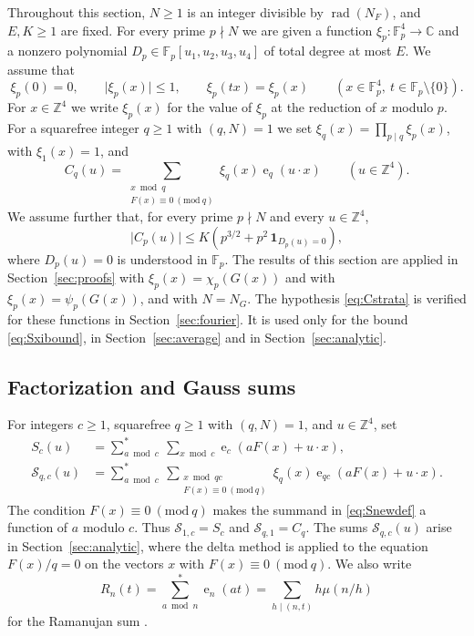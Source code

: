 \documentclass[11pt]{amsart}
\numberwithin{equation}{section}
\numberwithin{figure}{section}
\theoremstyle{definition}
\newcommand{\Z}{\mathbb{Z}}
\newcommand{\C}{\mathbb{C}}
\newcommand{\F}{\mathcal{F}}
\newcommand{\e}{\operatorname{e}}
\newcommand{\imod}[1]{\ (\mathrm{mod}\ #1)}
\newcommand{\abs}[1]{\lvert #1\rvert}
\newcommand{\Fp}{\mathbb F_p}
\newcommand{\rad}{\operatorname{rad}}
\begin{document}
Throughout this section, $N\ge1$ is an integer divisible by
$\rad(N_F)$, and $E,K\ge1$ are fixed. For every prime $p\nmid N$ we
are given a function $\xi_p:\Fp^4\to\C$ and a nonzero polynomial
$D_p\in\Fp[u_1,u_2,u_3,u_4]$ of total degree at most $E$. We assume
that
\begin{equation}\label{eq:weightproperties}
 \xi_p(0)=0,\qquad\abs{\xi_p(x)}\le1,\qquad\xi_p(tx)=\xi_p(x)
 \qquad(x\in\Fp^4,\ t\in\Fp\setminus\{0\}).
\end{equation}
For $x\in\Z^4$ we write $\xi_p(x)$ for the value of $\xi_p$ at the
reduction of $x$ modulo $p$. For a squarefree integer $q\ge1$ with
$(q,N)=1$ we set $\xi_q(x)=\prod_{p\mid q}\xi_p(x)$, with
$\xi_1(x)=1$, and
\begin{equation}\label{eq:Cdef}
 C_q(u)=\sum_{\substack{x\bmod q\\F(x)\equiv0\imod q}}\xi_q(x)\e_q(u\cdot x)
 \qquad(u\in\Z^4).
\end{equation}
We assume further that, for every prime $p\nmid N$ and every
$u\in\Z^4$,
\begin{equation}\label{eq:Cstrata}
 \abs{C_p(u)}\le K(p^{3/2}+p^2\,\mathbf 1_{D_p(u)=0}),
\end{equation}
where $D_p(u)=0$ is understood in $\Fp$. The results of this section
are applied in Section~\ref{sec:proofs} with $\xi_p(x)=\chi_p(G(x))$
and with $\xi_p(x)=\psi_p(G(x))$, and with $N=N_G$. The hypothesis
\eqref{eq:Cstrata} is verified for these functions in
Section~\ref{sec:fourier}. It is used only for the bound
\eqref{eq:Sxibound}, in Section~\ref{sec:average} and in
Section~\ref{sec:analytic}.

\subsection{Factorization and Gauss sums}\label{sec:gauss}

For integers $c\ge1$, squarefree $q\ge1$ with $(q,N)=1$, and
$u\in\Z^4$, set
\begin{align}
 S_c(u)&=\sum_{a\bmod c}^{*}\ \sum_{x\bmod c}\e_c(aF(x)+u\cdot x),\label{eq:Sdef}\\
 \mathcal S_{q,c}(u)&=\sum_{a\bmod c}^{*}\
 \sum_{\substack{x\bmod qc\\F(x)\equiv0\imod q}}
 \xi_q(x)\e_{qc}(aF(x)+u\cdot x).\label{eq:Snewdef}
\end{align}
The condition $F(x)\equiv0\imod q$ makes the summand in
\eqref{eq:Snewdef} a function of $a$ modulo $c$. Thus
$\mathcal S_{1,c}=S_c$ and $\mathcal S_{q,1}=C_q$. The sums
$\mathcal S_{q,c}(u)$ arise in Section~\ref{sec:analytic}, where the
delta method is applied to the equation $F(x)/q=0$ on the vectors
$x$ with $F(x)\equiv0\imod q$. We also write
\begin{equation}\label{eq:ramanujan}
 R_n(t)=\sum_{a\bmod n}^{*}\e_n(at)=\sum_{h\mid(n,t)}h\mu(n/h)
\end{equation}
for the Ramanujan sum \cite[Theorem~4.1]{MV}.
\end{document}
